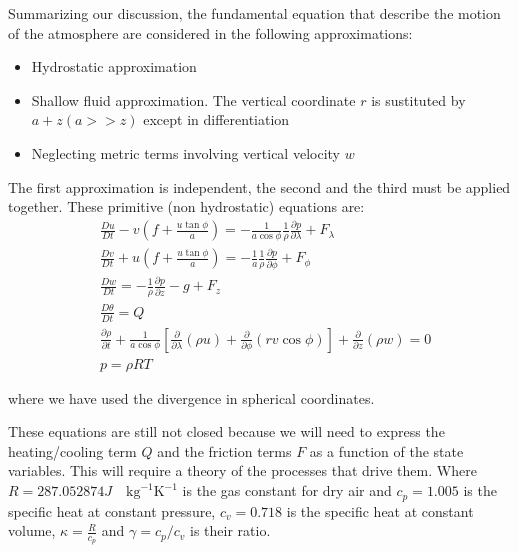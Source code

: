 Summarizing our discussion, the fundamental equation that describe the
motion of the atmosphere are considered in the following approximations:
\begin{itemize}
	\item Hydrostatic approximation
	\item Shallow fluid approximation. The vertical coordinate $r$ is sustituted by $a+z(a>>z)$ except in differentiation
	\item Neglecting metric terms involving vertical velocity $w$
\end{itemize}
The first approximation is independent, the second and the third must be applied together. These primitive (non hydrostatic) equations are:
\[\begin{aligned}
		 & \frac{D u}{Dt} - v\left(f +  \frac{u \tan{\phi}}{a}\right)  = -\frac{1}{ a \cos{\phi}}\frac{1}{\rho}\frac{\partial p}{\partial \lambda}   + F_\lambda                                                     \\
		 & \frac{D v}{Dt} + u\left( f + \frac{u \tan{\phi}}{a}\right)  = -\frac{1}{a}\frac{1}{\rho}\frac{\partial p}{\partial \phi}  + F_\phi                                                                        \\
		 & \frac{D w}{Dt}  = -\frac{1}{\rho }\frac{\partial p}{\partial z} -g  + F_z \label{Eq:PrimEq}                                                                                                               \\
		 & \frac{D \theta}{Dt} = Q                                                                                                                                                                                   \\
		 & \frac{\partial \rho}{\partial t}+\frac{1}{a\cos{\phi}}\left[ \frac{\partial }{\partial \lambda}(\rho u) + \frac{\partial }{\partial \phi}(rv\cos{\phi} )\right] +\frac{\partial }{\partial z}(\rho w) = 0 \\
		 & p = \rho R T
	\end{aligned}\]

where we have used the divergence in spherical coordinates.

These equations are still not closed because we will need to express the heating/cooling term \(Q\) and the friction terms \(F\) as a function of the state variables. This will require a theory of the processes that drive them. Where \(R=287.052874 J \quad \text{kg}^{-1} \text{K}^{-1}\) is the gas constant for dry air and \(c_p = 1.005\) is the specific heat at constant pressure, \(c_v = 0.718\) is the specific heat at constant volume, \(\kappa = \frac{R}{c_p}\) and \(\gamma=c_p/c_v\) is their ratio.

